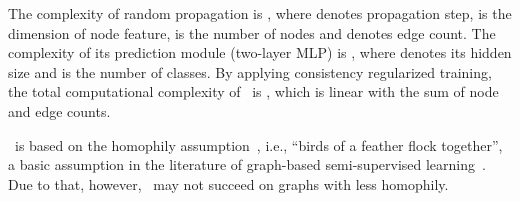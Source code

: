  The complexity of random propagation is  , where  denotes propagation step,  is the dimension of node feature,  is the number of nodes and  denotes edge count. The complexity of its prediction module (two-layer MLP) is , where  denotes its hidden size and  is the number of classes. 
By applying consistency regularized training, the total computational complexity of \model\ is , which is linear with the sum of node and edge counts. 

\model\ is based on the homophily assumption~\cite{mcpherson2001birds}, i.e., ``birds of a feather flock together'', a basic assumption in the literature of graph-based semi-supervised learning~\cite{zhu2003semi}. Due to that, however, \model\ may not succeed on graphs with less homophily. 



